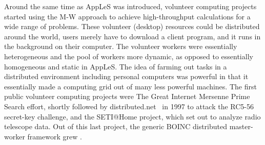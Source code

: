 \documentclass{sig-alternate}
\begin{document}





Around the same time as AppLeS was introduced, volunteer computing
projects started using the M-W approach to achieve high-throughput calculations
for a wide range of problems.
These volunteer (desktop) resources could be distributed around the world, users
merely have to download a client program, and it runs in the
background on their computer.  The volunteer workers were essentially
heterogeneous and the pool of workers more dynamic, as opposed to
essentially homogeneous and static in AppLeS. The idea of farming out
tasks in a distributed environment including personal computers was
powerful in that it essentially made a computing grid out of many less
powerful machines.
The first public volunteer computing projects were The Great Internet Mersenne
Prime Search effort\cite{woltman:2004:gimps}, shortly followed by
distributed.net~\cite{Lawton:2000:distributednet} in 1997 to attack the RC5-56
secret-key challenge, and the SETI@Home project, which set out to analyze radio
telescope data.
Out of this last project, the generic BOINC distributed master-worker framework
grew \cite{Anderson:2004:BSP:1032646.1033223}.
\end{document}
